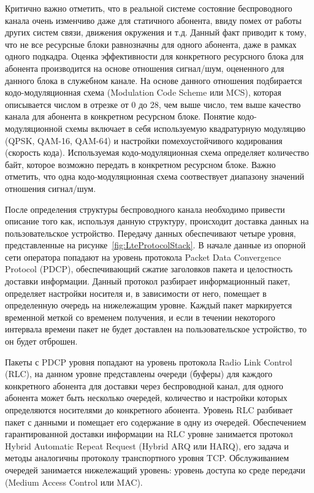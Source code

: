 Критично важно отметить, что в реальной системе состояние беспроводного канала очень изменчиво даже для статичного абонента, ввиду помех от работы других систем связи, движения окружения и т.д. Данный факт приводит к тому, что не все ресурсные блоки равнозначны для одного абонента, даже в рамках одного подкадра. Оценка эффективности для конкретного ресурсного блока для абонента производится на основе отношения сигнал/шум, оцененного для данного блока в служебном канале. На основе данного отношения подбирается кодо-модуляционная схема (Modulation Code Scheme или MCS), которая описывается числом в отрезке от 0 до 28, чем выше число, тем выше качество канала для абонента в конкретном ресурсном блоке. Понятие кодо-модуляционной схемы включает в себя используемую квадратурную модуляцию (QPSK, QAM-16, QAM-64) и настройки помехоустойчивого кодирования (скорость кода). Используемая кодо-модуляционная схема определяет количество байт, которое возможно передать в конкретном ресурсном блоке. Важно отметить, что одна кодо-модуляционная схема соотвествует диапазону значений отношения сигнал/шум.

После определения структуры беспроводного канала необходимо привести описание того как, используя данную структуру, происходит доставка данных на пользовательское устройство. Передачу данных обеспечивают четыре уровня, представленные на рисунке~\ref{fig:LteProtocolStack}. В начале данные из опорной сети оператора попадают на уровень протокола Packet Data Convergence Protocol (PDCP), обеспечивающий сжатие заголовков пакета и целостность доставки информации. Данный протокол разбирает информационный пакет, определяет настройки носителя и, в зависимости от него, помещает в определенную очередь на нижележащим уровне. Каждый пакет маркируется временной меткой со временем получения, и если в течении некоторого интервала времени пакет не будет доставлен на пользовательское устройство, то он будет отброшен.

Пакеты с PDCP уровня попадают на уровень протокола Radio Link Control (RLC), на данном уровне представлены очереди (буферы) для каждого конкретного абонента для доставки через беспроводной канал, для одного абонента может быть несколько очередей, количество и настройки которых определяются носителями до конкретного абонента. Уровень RLC разбивает пакет с данными и помещает его содержание в одну из очередей. Обеспечением гарантированной доставки информации на RLC уровне занимается протокол Hybrid Automatic Repeat Request (Hybrid ARQ или HARQ), его задача и методы аналогичны протоколу транспортного уровня TCP. Обслуживанием очередей занимается нижележащий уровень: уровень доступа ко среде передачи (Medium Access Control или MAC).

